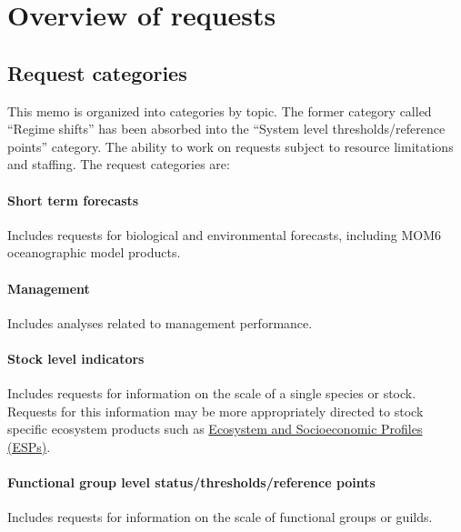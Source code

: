 \documentclass[
  10pt,
]{article}
\begin{document}
\section{Overview of requests}\label{overview-of-requests}

\subsection{Request categories}\label{request-categories}

This memo is organized into categories by topic. The former category
called ``Regime shifts'' has been absorbed into the ``System level
thresholds/reference points'' category. The ability to work on requests
subject to resource limitations and staffing. The request categories
are:

\paragraph{Short term forecasts}\label{short-term-forecasts}

Includes requests for biological and environmental forecasts, including
MOM6 oceanographic model products.

\paragraph{Management}\label{management}

Includes analyses related to management performance.

\paragraph{Stock level indicators}\label{stock-level-indicators}

Includes requests for information on the scale of a single species or
stock. Requests for this information may be more appropriately directed
to stock specific ecosystem products such as
\href{https://www.fisheries.noaa.gov/new-england-mid-atlantic/science-data/ecosystem-and-socioeconomic-profiles-northeast-united-states}{Ecosystem
and Socioeconomic Profiles (ESPs)}.

\paragraph{Functional group level status/thresholds/reference
points}\label{functional-group-level-statusthresholdsreference-points}

Includes requests for information on the scale of functional groups or
guilds.
\end{document}
